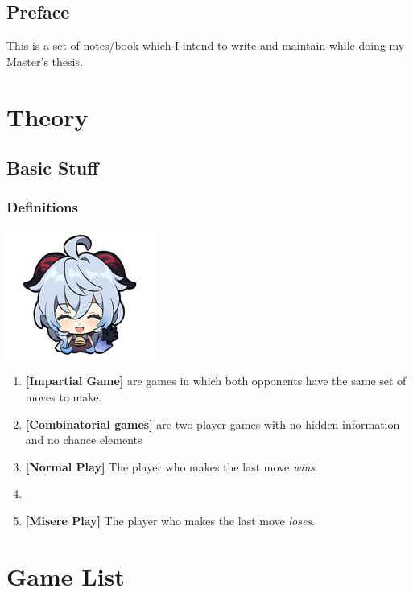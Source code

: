 \documentclass[12pt,oneside]{book}
\begin{document}
\setmainfont{Meows}

\tableofcontents

\chapter*{Preface}
This is a set of notes/book which I intend to write and maintain while doing my Master's  thesis. 


\part{Theory}
\chapter{Basic Stuff}
\section{Definitions}
\begin{marginfigure}%
    \includegraphics[width=2.4\marginparwidth]{graphics/(10).png}
\end{marginfigure}
\begin{enumerate}
    \item \textbf{[Impartial Game]} are games in which both opponents have the same set of moves to make.
    \item \textbf{[Combinatorial games]} are two-player games with no hidden information and no chance elements
    \item \textbf{[Normal Play]} The player who makes the last move \textit{wins}.
    \item \item \textbf{[Misere Play]} The player who makes the last move \textit{loses}.
\end{enumerate}



\part{Game List}
\end{document}
